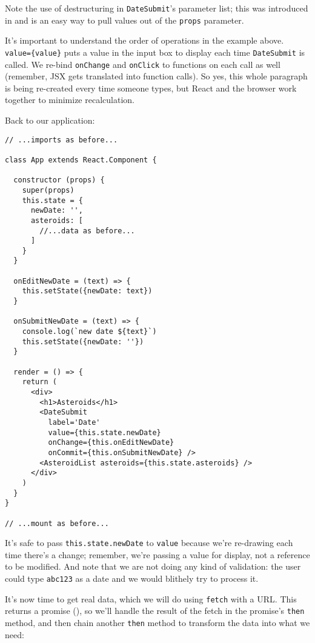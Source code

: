Note the use of destructuring in \texttt{DateSubmit}'s parameter list;
this was introduced in 
and is an easy way to pull values out of the \texttt{props} parameter.

It's important to understand the order of operations in the example above.
\texttt{value=\{value\}} puts a value in the input box to display each time \texttt{DateSubmit} is called.
We re-bind \texttt{onChange} and \texttt{onClick} to functions on each call as well
(remember, JSX gets translated into function calls).
So yes,
this whole paragraph is being re-created every time someone types,
but React and the browser work together to minimize recalculation.

Back to our application:

\begin{verbatim}
// ...imports as before...

class App extends React.Component {

  constructor (props) {
    super(props)
    this.state = {
      newDate: '',
      asteroids: [
        //...data as before...
      ]
    }
  }

  onEditNewDate = (text) => {
    this.setState({newDate: text})
  }

  onSubmitNewDate = (text) => {
    console.log(`new date ${text}`)
    this.setState({newDate: ''})
  }

  render = () => {
    return (
      <div>
        <h1>Asteroids</h1>
        <DateSubmit
          label='Date'
          value={this.state.newDate}
          onChange={this.onEditNewDate}
          onCommit={this.onSubmitNewDate} />
        <AsteroidList asteroids={this.state.asteroids} />
      </div>
    )
  }
}

// ...mount as before...
\end{verbatim}

\noindent
It's safe to pass \texttt{this.state.newDate} to \texttt{value}
because we're re-drawing each time there's a change;
remember, we're passing a value for display,
not a reference to be modified.
And note that we are not doing any kind of validation:
the user could type \texttt{abc123} as a date
and we would blithely try to process it.

It's now time to get real data,
which we will do using \texttt{fetch} with a URL.
This returns a promise (),
so we'll handle the result of the fetch in the promise's \texttt{then} method,
and then chain another \texttt{then} method to transform the data into what we need:

